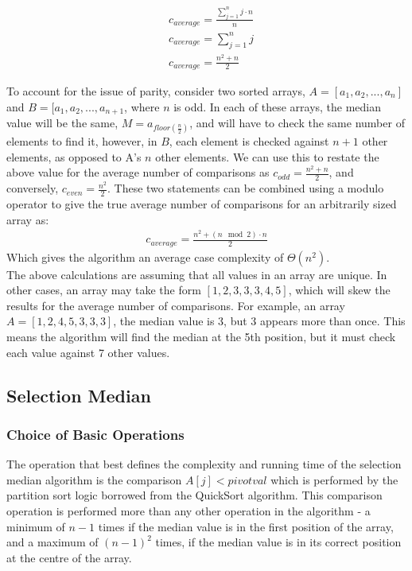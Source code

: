 \documentclass{article}
\begin{document}
            \begin{align}
                & c_{average} = \frac{\sum_{j = 1}^{n} j \cdot n}{n} \\
                & c_{average} = \sum_{j = 1}^n j\\
                & c_{average} = \frac{n^2 + n}{2}
            \end{align}

            To account for the issue of parity, consider two sorted arrays, $A = [a_1, a_2, ..., a_n]$ and $B = [a_1, a_2, ..., a_{n+1}$, where $n$ is odd. In each of these arrays, the median value will be the same, $M = a_{floor(\frac{n}{2})}$, and will have to check the same number of elements to find it, however, in $B$, each element is checked against $n + 1$ other elements, as opposed to A's $n$ other elements. We can use this to restate the above value for the average number of comparisons as $c_{odd} = \frac{n^2 + n}{2}$, and conversely, $c_{even} = \frac{n^2}{2}$. These two statements can be combined using a modulo operator to give the true average number of comparisons for an arbitrarily sized array as:
            \begin{align}
                c_{average} = \frac{n^2 + (n\mod 2) \cdot n}{2}
            \end{align}
            Which gives the algorithm an average case complexity of $\Theta(n^2)$.\\
            The above calculations are assuming that all values in an array are unique. In other cases, an array may take the form $[1, 2, 3, 3, 3, 4, 5]$, which will skew the results for the average number of comparisons. For example, an array $A = [1, 2, 4, 5, 3, 3, 3]$, the median value is 3, but 3 appears more than once. This means the algorithm will find the median at the 5th position, but it must check each value against 7 other values.

    \subsection{Selection Median}
        \subsubsection{Choice of Basic Operations}
            The operation that best defines the complexity and running time of the selection median algorithm is the comparison $A[j] < pivotval$ which is performed by the partition sort logic borrowed from the QuickSort algorithm. This comparison operation is performed more than any other operation in the algorithm - a minimum of $n - 1$ times if the median value is in the first position of the array, and a maximum of $(n - 1)^2$ times, if the median value is in its correct position at the centre of the array.
\end{document}
